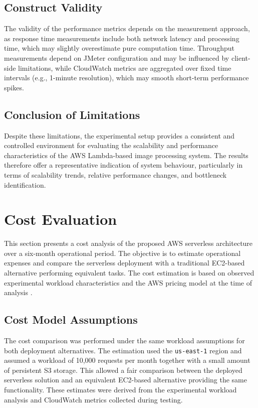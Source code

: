 \documentclass[11pt,a4paper,twocolumn]{article}
\begin{document}
\subsection{Construct Validity}

The validity of the performance metrics depends on the measurement approach, as response time measurements include both network latency and processing time, which may slightly overestimate pure computation time. Throughput measurements depend on JMeter configuration and may be influenced by client-side limitations, while CloudWatch metrics are aggregated over fixed time intervals (e.g., 1-minute resolution), which may smooth short-term performance spikes.

\subsection{Conclusion of Limitations}

Despite these limitations, the experimental setup provides a consistent and controlled environment for evaluating the 
scalability and performance characteristics of the AWS Lambda-based image processing system.
The results therefore offer a representative indication of system behaviour, 
particularly in terms of scalability trends, relative performance changes, and bottleneck identification.


\section{Cost Evaluation}

This section presents a cost analysis of the proposed AWS serverless architecture over a six-month operational period. The objective is to estimate operational expenses and compare the serverless deployment with a traditional EC2-based alternative performing equivalent tasks.
The cost estimation is based on observed experimental workload characteristics and the AWS pricing model at the time of analysis \citep{aws_pricing}.


\subsection{Cost Model Assumptions}

The cost comparison was performed under the same workload assumptions for both deployment alternatives. The estimation used the \texttt{us-east-1} region and assumed a workload of 10,000 requests per month together with a small amount of persistent S3 storage. This allowed a fair comparison between the deployed serverless solution and an equivalent EC2-based alternative providing the same functionality. These estimates were derived from the experimental workload analysis and CloudWatch metrics collected during testing.
\end{document}
